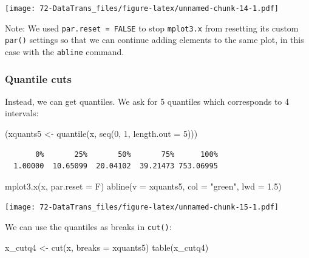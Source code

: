 \documentclass[
]{book}
\newenvironment{Shaded}{\begin{snugshade}}{\end{snugshade}}
\newcommand{\AttributeTok}[1]{\textcolor[rgb]{0.77,0.63,0.00}{#1}}
\newcommand{\DecValTok}[1]{\textcolor[rgb]{0.00,0.00,0.81}{#1}}
\newcommand{\FloatTok}[1]{\textcolor[rgb]{0.00,0.00,0.81}{#1}}
\newcommand{\FunctionTok}[1]{\textcolor[rgb]{0.00,0.00,0.00}{#1}}
\newcommand{\NormalTok}[1]{#1}
\newcommand{\OtherTok}[1]{\textcolor[rgb]{0.56,0.35,0.01}{#1}}
\newcommand{\StringTok}[1]{\textcolor[rgb]{0.31,0.60,0.02}{#1}}
\begin{document}
\texttt{[image: 72-DataTrans\_files/figure-latex/unnamed-chunk-14-1.pdf]}

Note: We used \texttt{par.reset\ =\ FALSE} to stop \texttt{mplot3.x} from resetting its custom \texttt{par()} settings so that we can continue adding elements to the same plot, in this case with the \texttt{abline} command.

\hypertarget{quantile-cuts}{%
\subsubsection{Quantile cuts}\label{quantile-cuts}}

Instead, we can get quantiles. We ask for 5 quantiles which corresponds to 4 intervals:

\begin{Shaded}
\begin{Highlighting}[]
\NormalTok{(xquants5 }\OtherTok{\textless{}{-}} \FunctionTok{quantile}\NormalTok{(x, }\FunctionTok{seq}\NormalTok{(}\DecValTok{0}\NormalTok{, }\DecValTok{1}\NormalTok{, }\AttributeTok{length.out =} \DecValTok{5}\NormalTok{)))}
\end{Highlighting}
\end{Shaded}

\begin{verbatim}
       0%       25%       50%       75%      100% 
  1.00000  10.65099  20.04102  39.21473 753.06995 
\end{verbatim}

\begin{Shaded}
\begin{Highlighting}[]
\FunctionTok{mplot3.x}\NormalTok{(x, }\AttributeTok{par.reset =}\NormalTok{ F)}
\FunctionTok{abline}\NormalTok{(}\AttributeTok{v =}\NormalTok{ xquants5, }\AttributeTok{col =} \StringTok{"green"}\NormalTok{, }\AttributeTok{lwd =} \FloatTok{1.5}\NormalTok{)}
\end{Highlighting}
\end{Shaded}

\texttt{[image: 72-DataTrans\_files/figure-latex/unnamed-chunk-15-1.pdf]}

We can use the quantiles as breaks in \texttt{cut()}:

\begin{Shaded}
\begin{Highlighting}[]
\NormalTok{x\_cutq4 }\OtherTok{\textless{}{-}} \FunctionTok{cut}\NormalTok{(x, }\AttributeTok{breaks =}\NormalTok{ xquants5)}
\FunctionTok{table}\NormalTok{(x\_cutq4)}
\end{Highlighting}
\end{Shaded}
\end{document}
